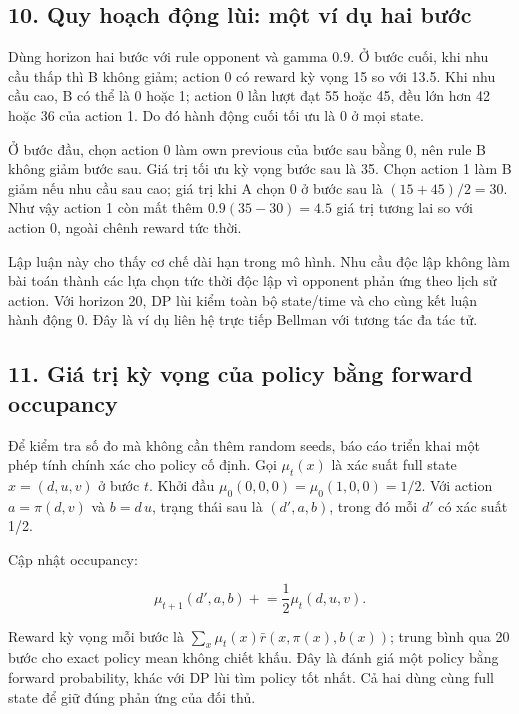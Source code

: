\subsection{10. Quy hoạch động lùi: một ví dụ hai
bước}\label{quy-houx1ea1ch-ux111ux1ed9ng-luxf9i-mux1ed9t-vuxed-dux1ee5-hai-bux1b0ux1edbc}

Dùng horizon hai bước với rule opponent và gamma 0.9. Ở bước cuối, khi
nhu cầu thấp thì B không giảm; action 0 có reward kỳ vọng 15 so với
13.5. Khi nhu cầu cao, B có thể là 0 hoặc 1; action 0 lần lượt đạt 55
hoặc 45, đều lớn hơn 42 hoặc 36 của action 1. Do đó hành động cuối tối
ưu là 0 ở mọi state.

Ở bước đầu, chọn action 0 làm own previous của bước sau bằng 0, nên rule
B không giảm bước sau. Giá trị tối ưu kỳ vọng bước sau là 35. Chọn
action 1 làm B giảm nếu nhu cầu sau cao; giá trị khi A chọn 0 ở bước sau
là \((15+45)/2=30\). Như vậy action 1 còn mất thêm \(0.9(35-30)=4.5\)
giá trị tương lai so với action 0, ngoài chênh reward tức thời.

Lập luận này cho thấy cơ chế dài hạn trong mô hình. Nhu cầu độc lập
không làm bài toán thành các lựa chọn tức thời độc lập vì opponent phản
ứng theo lịch sử action. Với horizon 20, DP lùi kiểm toàn bộ state/time
và cho cùng kết luận hành động 0. Đây là ví dụ liên hệ trực tiếp Bellman
với tương tác đa tác tử.

\subsection{11. Giá trị kỳ vọng của policy bằng forward
occupancy}\label{giuxe1-trux1ecb-kux1ef3-vux1ecdng-cux1ee7a-policy-bux1eb1ng-forward-occupancy}

Để kiểm tra số đo mà không cần thêm random seeds, báo cáo triển khai một
phép tính chính xác cho policy cố định. Gọi \(\mu_t(x)\) là xác suất
full state \(x=(d,u,v)\) ở bước \(t\). Khởi đầu
\(\mu_0(0,0,0)=\mu_0(1,0,0)=1/2\). Với action \(a=\pi(d,v)\) và
\(b=d\,u\), trạng thái sau là \((d',a,b)\), trong đó mỗi \(d'\) có xác
suất 1/2.

Cập nhật occupancy:

\[\mu_{t+1}(d',a,b)\mathrel{+}=\frac12\mu_t(d,u,v).\]

Reward kỳ vọng mỗi bước là \(\sum_x\mu_t(x)\bar r(x,\pi(x),b(x))\);
trung bình qua 20 bước cho exact policy mean không chiết khấu. Đây là
đánh giá một policy bằng forward probability, khác với DP lùi tìm policy
tốt nhất. Cả hai dùng cùng full state để giữ đúng phản ứng của đối thủ.

